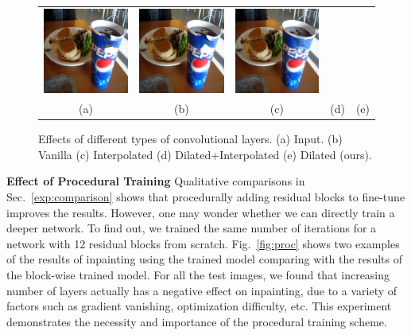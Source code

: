 \begin{figure}[h!]
\begin{tabular}{ccccc}
\includegraphics[width=.2\textwidth]{figures/conv/000000311303_synthesized_image-0.png}&
\includegraphics[width=.2\textwidth]{figures/conv/000000311303_synthesized_image-1.png}&
\includegraphics[width=.2\textwidth]{figures/conv/000000311303_synthesized_image.jpg}\\
(a) & (b) & (c) & (d) & (e)  \\
\end{tabular}
\caption{Effects of different types of convolutional layers. (a) Input. (b) Vanilla (c) Interpolated (d) Dilated+Interpolated (e) Dilated (ours).}
\label{fig:face}
\vspace{-5pt}
\end{figure}  

\noindent\textbf{Effect of Procedural Training} Qualitative comparisons in Sec.~\ref{exp:comparison} shows that procedurally adding residual blocks to fine-tune improves the results. However, one may wonder whether we can directly train a deeper network. To find out, we trained the same number of iterations for a network with 12 residual blocks from scratch. Fig.~\ref{fig:proc} shows two examples of the results of inpainting using the trained model comparing with the results of the block-wise trained model. For all the test images, we found that increasing number of layers actually has a negative effect on inpainting, due to a variety of factors such as gradient vanishing, optimization difficulty, etc. This experiment demonstrates the necessity and importance of the procedural training scheme.


